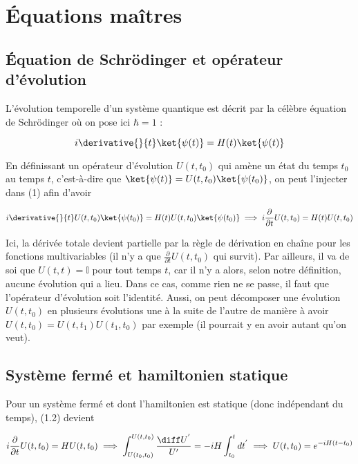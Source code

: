 \section{Équations maîtres}
\subsection{Équation de Schrödinger et opérateur d'évolution}
L'évolution temporelle d'un système quantique est décrit par la célèbre équation de Schrödinger où on pose ici $\hbar = 1$ :

\begin{equation}
    i\derivative{}{t}\ket{\psi(t)} = H(t)\ket{\psi(t)}
\end{equation}

En définissant un opérateur d'évolution $U(t,t_0)$ qui amène un état du temps $t_0$ au temps $t$, c'est-à-dire que $\ket{\psi(t)} = U(t,t_0)\ket{\psi(t_0)}$, on peut l'injecter dans (1) afin d'avoir 

\begin{equation}
    i \derivative{}{t}U(t,t_0)\ket{\psi(t_0)} = H(t)U(t,t_0)\ket{\psi(t_0)} \implies i \frac{\partial}{\partial t}U(t,t_0) = H(t)U(t,t_0)
\end{equation}

Ici, la dérivée totale devient partielle par la règle de dérivation en chaîne pour les fonctions multivariables (il n'y a que $\frac{\partial}{\partial t}U(t,t_0)$ qui survit). Par ailleurs, il va de soi que $U(t,t) = \mathbb{I}$ pour tout temps $t$, car il n'y a alors, selon notre définition, aucune évolution qui a lieu. Dans ce cas, comme rien ne se passe, il faut que l'opérateur d'évolution soit l'identité. Aussi, on peut décomposer une évolution $U(t, t_0)$ en plusieurs évolutions une à la suite de l'autre de manière à avoir $U(t,t_0) = U(t,t_1)U(t_1,t_0)$ par exemple (il pourrait y en avoir autant qu'on veut).

\subsection{Système fermé et hamiltonien statique}
Pour un système fermé et dont l'hamiltonien est statique (donc indépendant du temps), (1.2) devient

\begin{equation}
    i\frac{\partial}{\partial t}U(t,t_0) = HU(t,t_0) \implies \int_{U(t_0,t_0)}^{U(t,t_0)}\frac{\diff U^{'}}{U'} = -iH \int_{t_0}^{t}dt^{'} \implies U(t,t_0) = e^{-iH(t-t_0)}
\end{equation}

